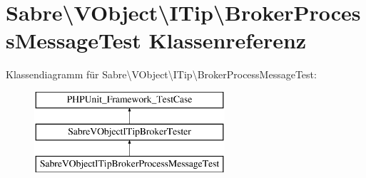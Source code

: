 \hypertarget{class_sabre_1_1_v_object_1_1_i_tip_1_1_broker_process_message_test}{}\section{Sabre\textbackslash{}V\+Object\textbackslash{}I\+Tip\textbackslash{}Broker\+Process\+Message\+Test Klassenreferenz}
\label{class_sabre_1_1_v_object_1_1_i_tip_1_1_broker_process_message_test}
Klassendiagramm für Sabre\textbackslash{}V\+Object\textbackslash{}I\+Tip\textbackslash{}Broker\+Process\+Message\+Test\+:\begin{figure}[H]
\begin{center}
\leavevmode
\includegraphics[height=3.000000cm]{class_sabre_1_1_v_object_1_1_i_tip_1_1_broker_process_message_test}
\end{center}
\end{figure}
